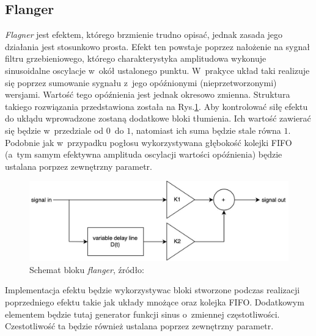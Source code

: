 
\subsection{Flanger}

\textit{Flagner} jest efektem, którego brzmienie trudno opisać, jednak zasada jego działania jest stosunkowo prosta. Efekt ten powstaje poprzez nałożenie na sygnał filtru grzebieniowego, którego charakterystyka amplitudowa wykonuje sinusoidalne oscylacje w~okół ustalonego punktu. W~prakyce układ taki realizuje się poprzez sumowanie sygnału z~jego opóźnionymi (nieprzetworzonymi) wersjami. Wartość tego opóźnienia jest jednak okresowo zmienna. Struktura takiego rozwiązania przedstawiona została na Rys.\ref{effects-flanger}. Aby kontrolować siłę efektu do ukłądu wprowadzone zostaną dodatkowe bloki tłumienia. Ich wartość zawierać się będzie w~przedziale od $0$~do $1$, natomiast ich suma będzie stale równa $1$. Podobnie jak w~przypadku pogłosu wykorzystywana głębokość kolejki FIFO (a~tym samym efektywna amplituda oscylacji wartości opóźnienia) będzie ustalana porpzez zewnętrzny parametr.

\vspace{0.5cm}
\begin{figure}[ht]
    \centering
    \includegraphics[scale=0.4]{img/flanger.jpg}
    \captionsetup{format=plain,justification=centering}
    \caption{Schemat bloku \textit{flanger}, źródło: \cite{fpga_pedal}}
    \label{effects-flanger}
\end{figure}
\vspace{0.5cm}

Implementacja efektu będzie wykorzystywac bloki stworzone podczas realizacji poprzedniego efektu takie jak układy mnożące oraz kolejka FIFO. Dodatkowym elementem będzie tutaj generator funkcji sinus o~zmiennej częstotliwości. Czestotliwość ta będzie również ustalana poprzez zewnętrzny parametr.


